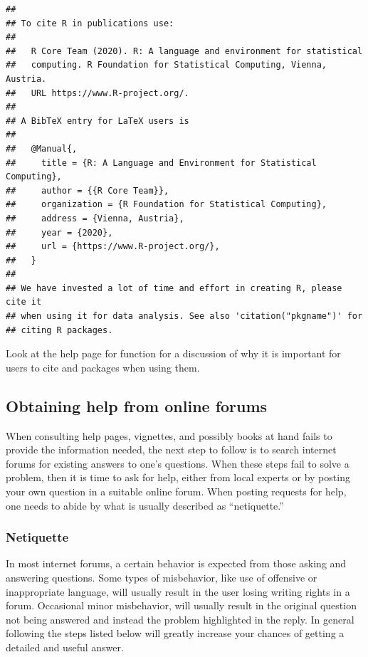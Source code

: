 \documentclass[krantz2]{krantz}\usepackage{knitr}
\begin{document}
\begin{knitrout}\footnotesize
{}\color{fgcolor}\begin{kframe}
\begin{alltt}
\hlstd{()}
\end{alltt}
\begin{verbatim}
##
## To cite R in publications use:
##
##   R Core Team (2020). R: A language and environment for statistical
##   computing. R Foundation for Statistical Computing, Vienna, Austria.
##   URL https://www.R-project.org/.
##
## A BibTeX entry for LaTeX users is
##
##   @Manual{,
##     title = {R: A Language and Environment for Statistical Computing},
##     author = {{R Core Team}},
##     organization = {R Foundation for Statistical Computing},
##     address = {Vienna, Austria},
##     year = {2020},
##     url = {https://www.R-project.org/},
##   }
##
## We have invested a lot of time and effort in creating R, please cite it
## when using it for data analysis. See also 'citation("pkgname")' for
## citing R packages.
\end{verbatim}
\end{kframe}
\end{knitrout}

\begin{playground}
  Look at the help page for function  for a discussion of why it is important for users to cite \Rpgrm and packages when using them.
\end{playground}

\subsection{Obtaining help from online forums}\label{sec:intro:net:help}

When consulting help pages, vignettes, and possibly books at hand fails to provide the information needed, the next step to follow is to search internet forums for existing answers to one's questions. When these steps fail to solve a problem, then it is time to ask for help, either from local experts or by posting your own question in a suitable online forum. When posting requests for help, one needs to abide by what is usually described as ``netiquette.''

\subsubsection{Netiquette}
In most internet forums, a certain behavior is expected from those asking and answering questions. Some types of misbehavior, like use of offensive or inappropriate language, will usually result in the user losing writing rights in a forum. Occasional minor misbehavior, will usually result in the original question not being answered and instead the problem highlighted in the reply. In general following the steps listed below will greatly increase your chances of getting a detailed and useful answer.
\end{document}
